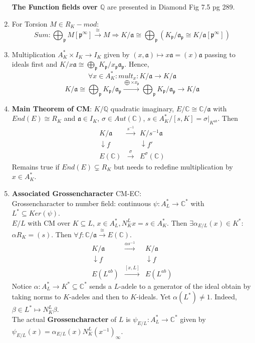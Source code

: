 \documentclass{article}
\newcommand{\Q}{\mathbb{Q}}
\newcommand{\C}{\mathbb{C}}
\newcommand{\af}{\mathfrak{a}}
\newcommand{\pp}{\mathfrak{p}}
\newcommand{\ra}{\rightarrow}
\newcommand{\Ra}{\Rightarrow}
\newcommand{\da}{\downarrow}
\newcommand{\raa}[1]{\overset{#1}{\longrightarrow}}
\begin{document}
\begin{multicols}{2}
\begin{enumerate}
\textbf{The Function fields over $\Q$} are presented in Diamond Fig 7.5 pg 289.


\item For Torsion $M \in R_K-mod$:  
\[Sum: \bigoplus_\pp M[\pp^\infty] \raa{\cong} M \Ra K/\af \cong \bigoplus_\pp (K_\pp/\af_\pp \cong K/\af[\pp^\infty])\]


\item Multiplication $A_K^* \times I_K \ra I_K$ given by $(x,\af) \mapsto x\af = (x)\af$ passing to ideals first and $K/x\af \cong \bigoplus_\pp K_\pp/x_\pp\af_\pp$. Hence, 
\[\forall x \in A_K^*: mult_x: K/\af \ra K/\af\]
\[K/\af \cong \bigoplus_\pp K_\pp/\af_\pp \raa{\bigoplus \times x_\pp} \bigoplus_\pp K_\pp/\af_\pp \ra K/\af\]
 
\item \textbf{Main Theorem of CM}: $K/\Q$ quadratic imaginary, $E/\C \cong \C/\af$ with $End(E) \cong R_K$ and $\af \in I_K$, $\sigma \in Aut(\C)$, $s \in A_K^*/ [s,K] = \sigma|_{K^{ab}}$. Then 
\[\begin{array}{rcl}
K/\af & \raa{s^{-1}} & K/s^{-1}\af \\
\da f & & \da f' \\
E(\C) & \raa{\sigma} & E^{\sigma}(\C)
\end{array}\]
Remains true if $End(E) \subsetneq R_K$ but needs to redefine multiplication by $x \in A_K^*$. 

\item \textbf{Associated Grossencharacter} CM-EC:\\
Grossencharacter to number field: continuous $\psi: A_L^* \ra \C^*$ with $L^* \subseteq Ker(\psi)$. \\
$E/L$ with CM over $K \subseteq L$, $x \in A_L^*, N_K^Lx = s \in A_K^*$. Then $\exists \alpha_{E/L}(x) \in K^*$: $\alpha R_K = (s)$. Then $\forall f: \C/\af \raa{\cong} E(\C)$. 
\[\begin{array}{rcl}
K/\af & \raa{\alpha s^{-1}} & K/\af \\
\da f && \da f \\
E(L^{ab}) & \raa{[x,L]} & E(L^{ab})
\end{array}\]
Notice $\alpha: A_L^* \ra K^* \subseteq \C^*$ sends a $L$-adele to a generator of the ideal obtain by taking norms to $K$-adeles and then to $K$-ideals. Yet $\alpha(L^*) \neq 1$. Indeed, $\beta \in L^*\mapsto N_K^L \beta$.\\

The actual \textbf{Grossencharacter} of $L$ is $\psi_{E/L}: A_L^* \ra \C^*$ given by $\psi_{E/L}(x) = \alpha_{E/L}(x) N_K^L(x^{-1})_\infty$.\\


\end{enumerate}
\end{multicols}
\end{document}
